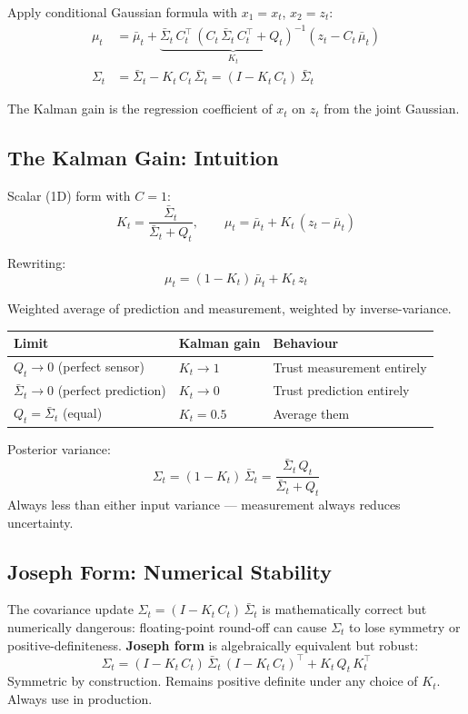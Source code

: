 \documentclass[11pt,a4paper]{article}
\begin{document}
Apply conditional Gaussian formula with $x_1 = x_t$, $x_2 = z_t$:
\begin{align}
\mu_t &= \bar{\mu}_t + \underbrace{\bar{\Sigma}_t\, C_t^\top\,(C_t\, \bar{\Sigma}_t\, C_t^\top + Q_t)^{-1}}_{K_t}(z_t - C_t\, \bar{\mu}_t) \\
\Sigma_t &= \bar{\Sigma}_t - K_t\, C_t\, \bar{\Sigma}_t = (I - K_t\, C_t)\,\bar{\Sigma}_t
\end{align}

The Kalman gain is the regression coefficient of $x_t$ on $z_t$ from the joint Gaussian.

\subsection{The Kalman Gain: Intuition}

Scalar (1D) form with $C = 1$:
\[
K_t = \frac{\bar{\Sigma}_t}{\bar{\Sigma}_t + Q_t}, \qquad \mu_t = \bar{\mu}_t + K_t\,(z_t - \bar{\mu}_t)
\]

Rewriting:
\[
\mu_t = (1 - K_t)\,\bar{\mu}_t + K_t\, z_t
\]

Weighted average of prediction and measurement, weighted by inverse-variance.

\begin{center}
\begin{tabular}{lll}
\toprule
\textbf{Limit} & \textbf{Kalman gain} & \textbf{Behaviour}\\
\midrule
$Q_t \to 0$ (perfect sensor) & $K_t \to 1$ & Trust measurement entirely \\
$\bar{\Sigma}_t \to 0$ (perfect prediction) & $K_t \to 0$ & Trust prediction entirely\\
$Q_t = \bar{\Sigma}_t$ (equal) & $K_t = 0.5$ & Average them \\
\bottomrule
\end{tabular}
\end{center}

Posterior variance:
\[
\Sigma_t = (1 - K_t)\,\bar{\Sigma}_t = \frac{\bar{\Sigma}_t\, Q_t}{\bar{\Sigma}_t + Q_t}
\]
Always less than either input variance --- measurement always reduces uncertainty.

\subsection{Joseph Form: Numerical Stability}

The covariance update $\Sigma_t = (I - K_t\, C_t)\,\bar{\Sigma}_t$ is mathematically correct but numerically dangerous: floating-point round-off can cause $\Sigma_t$ to lose symmetry or positive-definiteness. \textbf{Joseph form} is algebraically equivalent but robust:
\begin{equation}
\boxed{\;\Sigma_t = (I - K_t\, C_t)\,\bar{\Sigma}_t\,(I - K_t\, C_t)^\top + K_t\, Q_t\, K_t^\top\;}
\end{equation}
Symmetric by construction. Remains positive definite under any choice of $K_t$. Always use in production.
\end{document}
